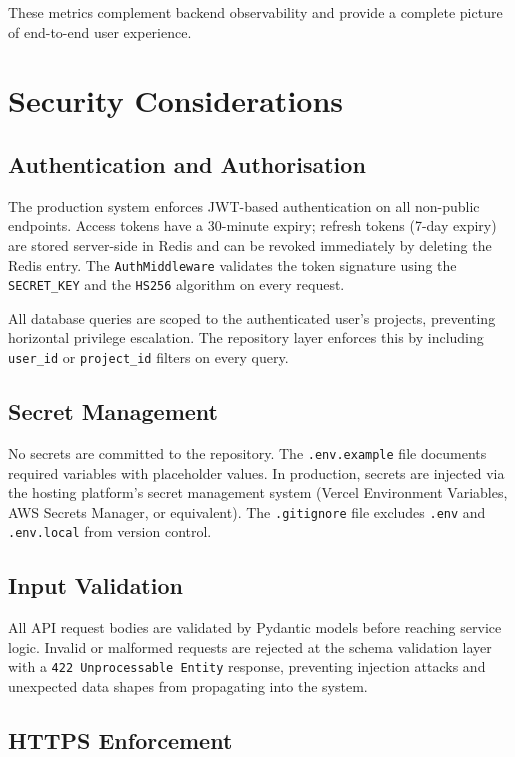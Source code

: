 These metrics complement backend observability and provide a complete picture of end-to-end user experience.

\section{Security Considerations}
\label{sec:security}

\subsection{Authentication and Authorisation}

The production system enforces JWT-based authentication on all non-public endpoints. Access tokens have a 30-minute expiry; refresh tokens (7-day expiry) are stored server-side in Redis and can be revoked immediately by deleting the Redis entry. The \texttt{AuthMiddleware} validates the token signature using the \texttt{SECRET\_KEY} and the \texttt{HS256} algorithm on every request.

All database queries are scoped to the authenticated user's projects, preventing horizontal privilege escalation. The repository layer enforces this by including \texttt{user\_id} or \texttt{project\_id} filters on every query.

\subsection{Secret Management}

No secrets are committed to the repository. The \texttt{.env.example} file documents required variables with placeholder values. In production, secrets are injected via the hosting platform's secret management system (Vercel Environment Variables, AWS Secrets Manager, or equivalent). The \texttt{.gitignore} file excludes \texttt{.env} and \texttt{.env.local} from version control.

\subsection{Input Validation}

All API request bodies are validated by Pydantic models before reaching service logic. Invalid or malformed requests are rejected at the schema validation layer with a \texttt{422 Unprocessable Entity} response, preventing injection attacks and unexpected data shapes from propagating into the system.

\subsection{HTTPS Enforcement}


